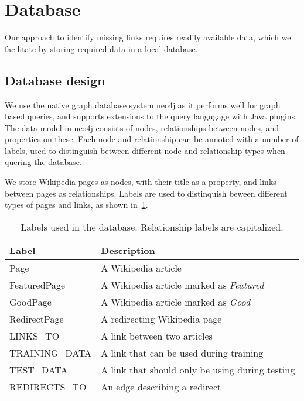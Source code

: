 \section{Database} \label{sec:db}
Our approach to identify missing links requires readily available data, which we facilitate by storing required data in a local database.

\subsection{Database design} \label{sec:db_design}
We use the native graph database system neo4j as it performs well for graph based queries, and supports extensions to the query langugage with Java plugins. The data model in neo4j consists of nodes, relationships between nodes, and properties on these. Each node and relationship can be annoted with a number of labels, used to distinguish between different node and relationship types when quering the database.

We store Wikipedia pages as nodes, with their title as a property, and links between pages as relationships. Labels are used to distinquish beween different types of pages and links, as shown in~\cref{tab:db_labels}.

\begin{table}[tbp]
\centering
\begin{tabular}{@{}ll@{}}
\toprule
\textbf{Label}         & \textbf{Description}                            \\ \midrule
Page                   & A Wikipedia article                             \\
FeaturedPage           & A Wikipedia article marked as \emph{Featured}   \\
GoodPage               & A Wikipedia article marked as \emph{Good}       \\
RedirectPage           & A redirecting Wikipedia page                    \\ \midrule
LINKS\_TO              & A link between two articles                     \\
TRAINING\_DATA         & A link that can be used during training         \\
TEST\_DATA             & A link that should only be using during testing \\
REDIRECTS\_TO          & An edge describing a redirect                   \\ \bottomrule
\end{tabular}
\caption{Labels used in the database. Relationship labels are capitalized.}
\label{tab:db_labels}
\end{table}


